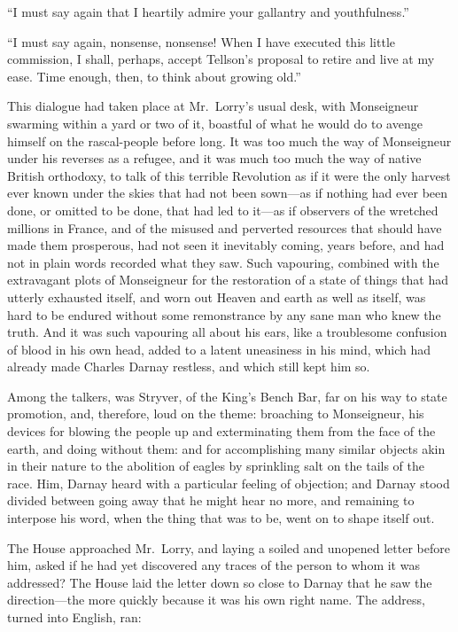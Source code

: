 ``I must say again that I heartily admire your gallantry and
youthfulness.''

``I must say again, nonsense, nonsense!  When I have executed this
little commission, I shall, perhaps, accept Tellson's proposal to retire
and live at my ease.  Time enough, then, to think about growing old.''

This dialogue had taken place at Mr.\ Lorry's usual desk, with Monseigneur
swarming within a yard or two of it, boastful of what he would do to
avenge himself on the rascal-people before long.  It was too much the
way of Monseigneur under his reverses as a refugee, and it was much
too much the way of native British orthodoxy, to talk of this terrible
Revolution as if it were the only harvest ever known under the skies
that had not been sown---as if nothing had ever been done, or omitted
to be done, that had led to it---as if observers of the wretched
millions in France, and of the misused and perverted resources that
should have made them prosperous, had not seen it inevitably coming,
years before, and had not in plain words recorded what they saw.  Such
vapouring, combined with the extravagant plots of Monseigneur for the
restoration of a state of things that had utterly exhausted itself,
and worn out Heaven and earth as well as itself, was hard to be endured
without some remonstrance by any sane man who knew the truth.  And it
was such vapouring all about his ears, like a troublesome confusion of
blood in his own head, added to a latent uneasiness in his mind, which
had already made Charles Darnay restless, and which still kept him so.

Among the talkers, was Stryver, of the King's Bench Bar, far on his
way to state promotion, and, therefore, loud on the theme:  broaching
to Monseigneur, his devices for blowing the people up and
exterminating them from the face of the earth, and doing without them:
and for accomplishing many similar objects akin in their nature to
the abolition of eagles by sprinkling salt on the tails of the race.
Him, Darnay heard with a particular feeling of objection; and Darnay
stood divided between going away that he might hear no more, and
remaining to interpose his word, when the thing that was to be, went
on to shape itself out.

The House approached Mr.\ Lorry, and laying a soiled and unopened
letter before him, asked if he had yet discovered any traces of the
person to whom it was addressed?  The House laid the letter down so
close to Darnay that he saw the direction---the more quickly because
it was his own right name.  The address, turned into English, ran:

